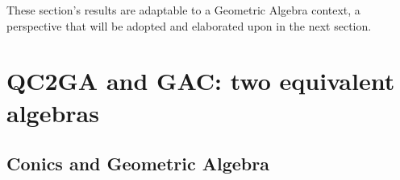 \documentclass{birkjour}
\begin{document}
These section's results are adaptable to a Geometric Algebra context, a perspective that will be adopted and elaborated upon in the next section.


\section{QC2GA and GAC: two equivalent algebras}
\label{sec:QCGA_and_GAC}
\subsection{Conics and Geometric Algebra}
\end{document}
